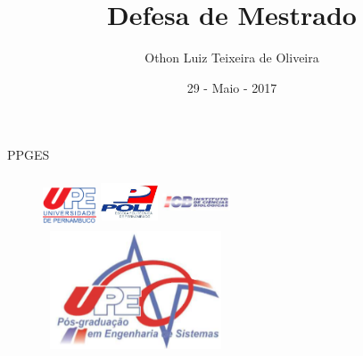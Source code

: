 \documentclass[11pt]{beamer}
\author{ Othon Luiz Teixeira de Oliveira }
\title[PPGES]{Defesa de Mestrado}
\institute{Escola Politécnica de Pernambuco -- Poli ---  UPE}
\date{29 - Maio - 2017}
\begin{document}
\begin{frame}
	\titlepage
\end{frame}


\newcommand{\capa}{
    \begin{tikzpicture}[remember picture,overlay]
        \node at (current page.south west)
            {\begin{tikzpicture}[remember picture, overlay]
                \fill[shading=radial,top color=orange,bottom color=orange,middle color=yellow] (0,0) rectangle (\paperwidth,\paperheight);
            \end{tikzpicture}
          };
    \end{tikzpicture}
}

\begin{frame}{PPGES}
	\begin{figure}[h]
		\includegraphics[width=16mm, height=13mm]{Figuras/Capa/upelogo.eps}
		\qquad \quad \quad \quad \quad
		\includegraphics[width=17mm, height=15mm]{Figuras/Capa/logoPoli.jpg}
		\qquad \quad \quad \quad \quad \quad \quad 	\vspace{0.5in}
		\includegraphics[width=20mm, height=15mm]{Figuras/Capa/icblogo.png}
		\\
		\includegraphics[width=55mm, height=35mm]{Figuras/Capa/logo_ppges3.png}
		
	\end{figure}
\end{frame}
\end{document}
